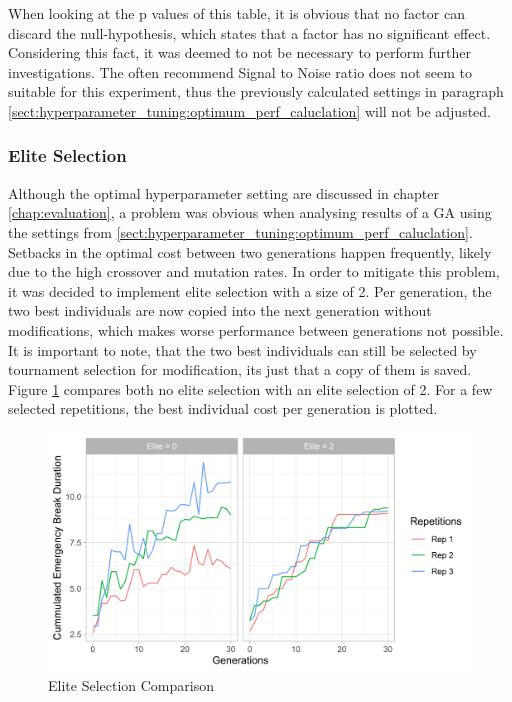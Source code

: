 When looking at the p values of this table, it is obvious that no factor can discard the null-hypothesis, which states that a factor has no significant effect. Considering this fact, it was deemed to not be necessary to perform further investigations. The often recommend Signal to Noise ratio does not seem to suitable for this experiment, thus the previously calculated settings in paragraph \ref{sect:hyperparameter_tuning:optimum_perf_caluclation} will not be adjusted.

\subsubsection{Elite Selection}
Although the optimal hyperparameter setting are discussed in chapter \ref{chap:evaluation}, a problem was obvious when analysing results of a GA using the settings from \ref{sect:hyperparameter_tuning:optimum_perf_caluclation}. Setbacks in the optimal cost between two generations happen frequently, likely due to the high crossover and mutation rates. In order to mitigate this problem, it was decided to implement elite selection with a size of 2. Per generation, the two best individuals are now copied into the next generation without modifications, which makes worse performance between generations not possible. It is important to note, that the two best individuals can still be selected by tournament selection for modification, its just that a copy of them is saved. Figure \ref{fig:hyperparameter_tuning:elite_no_elite_comp} compares both no elite selection with an elite selection of 2. For a few selected repetitions, the best individual cost per generation is plotted.

\begin{figure}[ht] 
	\label{fig:hyperparameter_tuning:elite_no_elite_comp}
	\includegraphics[width=1\linewidth]{simulations/evaluation/plots/elite_vs_no_elite_generations}
	\caption{Elite Selection Comparison}
\end{figure}

